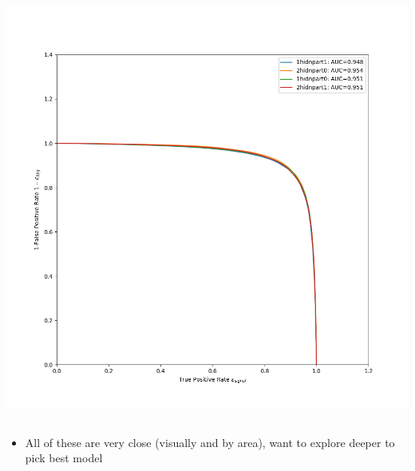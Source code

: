 \documentclass[10pt]{beamer}
\begin{document}
{\begin{columns}
\begin{column}{0.5\textwidth}
\includegraphics[width=1.0\textwidth]{Images/modelouts/mujetsbothroc.png}
\end{column}
\end{columns}
\begin{itemize}
\item All of these are very close (visually and by area), want to explore deeper to pick best model
\end{itemize}
}
\end{document}
